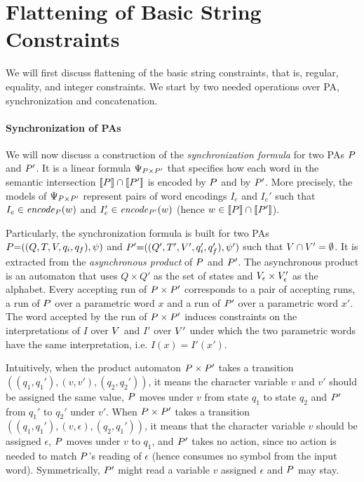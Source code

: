\documentclass[sigplan,review,anonymous]{acmart}\settopmatter{printfolios=true,printccs=false,printacmref=false}
\begin{document}



\section{Flattening of Basic String Constraints}
\label{sec:flattening}
We will first discuss flattening of the basic string constraints, that is,
regular, equality, and integer constraints. We start by two needed operations over PA, synchronization and concatenation.

\paragraph{Synchronization of PAs}
We will now discuss a construction of the \emph{synchronization formula} for two PAs $P$ and $P'$. 
It is a linear formula $\Psi_{P \times P'}$ 
that specifies how each word in the semantic intersection $[\![P]\!] \cap [\![P']\!]$ is encoded by $P$ and by $P'$.
%
More precisely, the models of $\Psi_{P \times P'}$ represent pairs of word
encodings 
$I_e$ and $I_e'$ such that $I_e\in\mathit{encode}_{P}(w)$ and $I_e'\in\mathit{encode}_{P'} (w)$ (hence $w\in[\![P]\!]\cap[\![P']\!]$).


Particularly, the synchronization formula is built for two PAs  
$P {=} ((Q,T,V,q_i,q_f),\psi)$ and ${P'} {=} ((Q',T',V',q_i',q_f'),\psi')$ such that $V \cap V' = \emptyset$. 
%
It is extracted from the \emph{asynchronous product} of $P$ and $P'$. 
%
The asynchronous product is an automaton that uses $Q\times Q'$ as the set of states and 
$V_\epsilon\times V'_\epsilon$
as the alphabet. 
%
Every accepting run of $P \times P'$ corresponds to a pair of accepting runs, 
a run of $P$ over a parametric word $x$ and a run of ${P'}$ over a parametric word $x'$. 
The word accepted by the run of $P \times P'$ induces constraints on the interpretations of $I$ over $V$ and $I'$ over $V'$ under which the two parametric words have the same interpretation, i.e. $I(x) = I'(x')$. 

Intuitively, when the product automaton $P \times P'$ takes a transition $((q_1,q_1'), (v,v'),(q_2,q_2'))$, 
it means the character variable $v$ and $v'$ should be assigned the same value,
$P$ moves under $v$ from state $q_1$ to state $q_2$ and ${P'}$ from $q_1'$ to $q_2'$ under $v'$.
%
When $P \times P'$ takes a transition $((q_1,q_1'), (v,\epsilon),(q_2,q_1'))$, 
it means that the character variable $v$ should be assigned $\epsilon$, 
$P$ moves under $v$ to $q_1$, and ${P'}$ takes no action, since no action is needed to match $P$'s reading of $\epsilon$ (hence consumes no symbol from the input word). Symmetrically, ${P'}$ might read a variable $v$ assigned $\epsilon$ and $P$ may stay.
\end{document}
